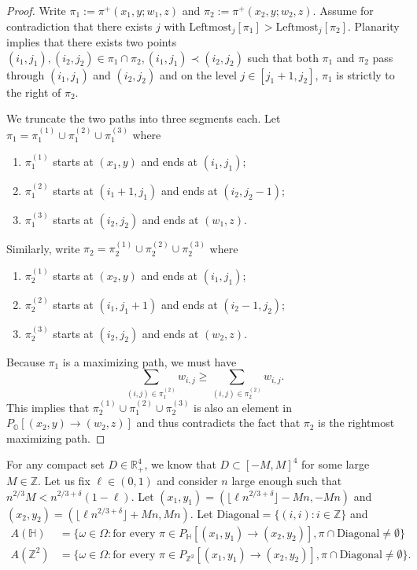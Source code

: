 \documentclass[11pt]{article}
\theoremstyle{definition}
\newcommand{\R}{\mathbb{R}}
\newcommand{\Z}{\mathbb{Z}}
\newcommand{\OO}{\mathbb{O}}
\newcommand{\HH}{\mathbb{H}}
\begin{document}
\begin{proof}
Write $\pi_1:=\pi^+(x_1,y;w_1,z)$ and $\pi_2:=\pi^+(x_2,y;w_2,z)$. 
Assume for contradiction that there exists $j$ with $\text{Leftmost}_j[\pi_1]>\text{Leftmost}_j[\pi_2]$. Planarity implies that there exists two points $(i_1,j_1), (i_2, j_2) \in \pi_1 \cap \pi_2, (i_1,j_1) \prec (i_2,j_2)$ such that both $\pi_1$ and $\pi_2$ pass through $(i_1,j_1)$ and $(i_2,j_2)$ and on the level $j \in [j_1 + 1, j_2]$, $\pi_1$ is strictly to the right of $\pi_2$. 

We truncate the two paths into three segments each. Let $\pi_1 =
\pi_1^{(1)} \cup \pi_1^{(2)} \cup \pi_1^{(3)}$ where

\begin{enumerate}[label=(\arabic*), itemsep=2pt, leftmargin=2em]
    \item $\pi_1^{(1)}$ starts at $(x_1,y)$ and ends at $(i_1,j_1)$;
    \item $\pi_1^{(2)}$ starts at $(i_1+1,j_1)$ and ends at $(i_2,j_2-1)$;
    \item $\pi_1^{(3)}$ starts at $(i_2,j_2)$ and ends at $(w_1,z)$.
\end{enumerate}

Similarly, write $\pi_2 =
\pi_2^{(1)} \cup \pi_2^{(2)} \cup \pi_2^{(3)}$ where
\begin{enumerate}[label=(\arabic*), itemsep=2pt, leftmargin=2em]
    \item $\pi_2^{(1)}$ starts at $(x_2,y)$ and ends at $(i_1,j_1)$;
    \item $\pi_2^{(2)}$ starts at $(i_1,j_1+1)$ and ends at $(i_2-1,j_2)$;
    \item $\pi_2^{(3)}$ starts at $(i_2,j_2)$ and ends at $(w_2,z)$.
\end{enumerate}

Because $\pi_1$ is a maximizing path, we must have
\begin{equation}\label{eq:1}
    \sum_{(i,j) \in \pi_1^{(2)}} w_{i,j} \geq \sum_{(i,j) \in \pi_2^{(2)}} w_{i,j}.
\end{equation}
This implies that $\pi_2^{(1)} \cup \pi_1^{(2)} \cup \pi_2^{(3)}$ is also an element in $P_{\OO}[(x_2,y) \rightarrow (w_2,z)]$ and thus contradicts the fact that $\pi_2$ is the rightmost maximizing path.
\end{proof}

For any compact set $D \in \R^4_+$, we know that $D \subset [-M,M]^4$ for some large $M \in \Z$. Let us fix $\ell \in (0,1)$ and consider $n$ large enough such that $n^{2/3}M < n^{2/3+\delta}(1-\ell)$. Let $(x_1, y_1) = (\lfloor \ell n^{2/3+\delta} \rfloor-Mn, -Mn)$ and $(x_2, y_2) = (\lfloor \ell n^{2/3+\delta} \rfloor+Mn, Mn)$. Let $\text{Diagonal} = \{(i,i): i \in \Z\}$ and 
\begin{equation}
\begin{aligned}
    A(\HH) &= \{\omega \in \Omega: \text{for every } \pi \in P_{\HH}[(x_1,y_1) \rightarrow (x_2,y_2)], \pi \cap \text{Diagonal} \neq \emptyset\}\\
    A(\Z^2) &= \{\omega \in \Omega: \text{for every } \pi \in P_{\Z^2}[(x_1,y_1) \rightarrow (x_2,y_2)], \pi \cap \text{Diagonal} \neq \emptyset\}.
\end{aligned} 
\end{equation}
\end{document}
